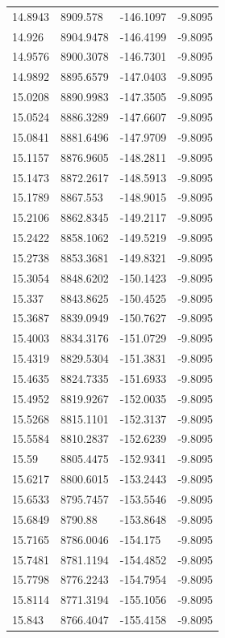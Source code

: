 \begin{table}[H]
\begin{tabular}{llll}
14.8943 & 8909.578 & -146.1097 & -9.8095 \\
14.926 & 8904.9478 & -146.4199 & -9.8095 \\
14.9576 & 8900.3078 & -146.7301 & -9.8095 \\
14.9892 & 8895.6579 & -147.0403 & -9.8095 \\
15.0208 & 8890.9983 & -147.3505 & -9.8095 \\
15.0524 & 8886.3289 & -147.6607 & -9.8095 \\
15.0841 & 8881.6496 & -147.9709 & -9.8095 \\
15.1157 & 8876.9605 & -148.2811 & -9.8095 \\
15.1473 & 8872.2617 & -148.5913 & -9.8095 \\
15.1789 & 8867.553 & -148.9015 & -9.8095 \\
15.2106 & 8862.8345 & -149.2117 & -9.8095 \\
15.2422 & 8858.1062 & -149.5219 & -9.8095 \\
15.2738 & 8853.3681 & -149.8321 & -9.8095 \\
15.3054 & 8848.6202 & -150.1423 & -9.8095 \\
15.337 & 8843.8625 & -150.4525 & -9.8095 \\
15.3687 & 8839.0949 & -150.7627 & -9.8095 \\
15.4003 & 8834.3176 & -151.0729 & -9.8095 \\
15.4319 & 8829.5304 & -151.3831 & -9.8095 \\
15.4635 & 8824.7335 & -151.6933 & -9.8095 \\
15.4952 & 8819.9267 & -152.0035 & -9.8095 \\
15.5268 & 8815.1101 & -152.3137 & -9.8095 \\
15.5584 & 8810.2837 & -152.6239 & -9.8095 \\
15.59 & 8805.4475 & -152.9341 & -9.8095 \\
15.6217 & 8800.6015 & -153.2443 & -9.8095 \\
15.6533 & 8795.7457 & -153.5546 & -9.8095 \\
15.6849 & 8790.88 & -153.8648 & -9.8095 \\
15.7165 & 8786.0046 & -154.175 & -9.8095 \\
15.7481 & 8781.1194 & -154.4852 & -9.8095 \\
15.7798 & 8776.2243 & -154.7954 & -9.8095 \\
15.8114 & 8771.3194 & -155.1056 & -9.8095 \\
15.843 & 8766.4047 & -155.4158 & -9.8095 \\

\end{tabular}
\end{table}
